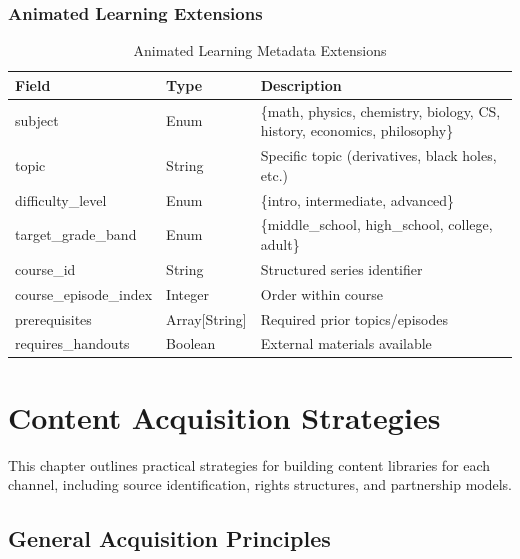 \documentclass[12pt,letterpaper,twoside]{report}
\begin{document}
\subsection{Animated Learning Extensions}

\begin{table}[H]
\centering
\caption{Animated Learning Metadata Extensions}
\begin{tabular}{@{}L{4cm}L{3cm}L{6.5cm}@{}}
\toprule
\textbf{Field} & \textbf{Type} & \textbf{Description} \\
\midrule
subject & Enum & \{math, physics, chemistry, biology, CS, history, economics, philosophy\} \\
topic & String & Specific topic (derivatives, black holes, etc.) \\
difficulty\_\allowbreak level & Enum & \{intro, intermediate, advanced\} \\
target\_\allowbreak grade\_\allowbreak band & Enum & \{middle\_\allowbreak school, high\_\allowbreak school, college, adult\} \\
course\_\allowbreak id & String & Structured series identifier \\
course\_\allowbreak episode\_\allowbreak index & Integer & Order within course \\
prerequisites & Array[String] & Required prior topics/episodes \\
requires\_\allowbreak handouts & Boolean & External materials available \\
\bottomrule
\end{tabular}
\end{table}

\chapter{Content Acquisition Strategies}
\label{ch:acquisition}

This chapter outlines practical strategies for building content libraries for each channel, including source identification, rights structures, and partnership models.

\section{General Acquisition Principles}
\end{document}
